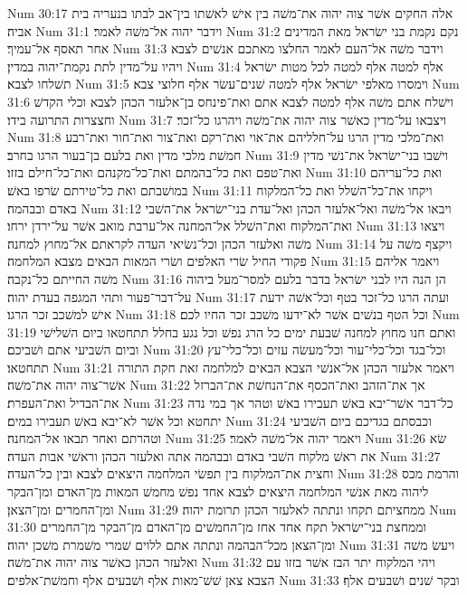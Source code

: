 Num 30:17  אלה החקים אשׁר צוה יהוה את־משׁה בין אישׁ לאשׁתו בין־אב לבתו בנעריה בית אביה׃
Num 31:1  וידבר יהוה אל־משׁה לאמר׃
Num 31:2  נקם נקמת בני ישׂראל מאת המדינים אחר תאסף אל־עמיך׃
Num 31:3  וידבר משׁה אל־העם לאמר החלצו מאתכם אנשׁים לצבא ויהיו על־מדין לתת נקמת־יהוה במדין׃
Num 31:4  אלף למטה אלף למטה לכל מטות ישׂראל תשׁלחו לצבא׃
Num 31:5  וימסרו מאלפי ישׂראל אלף למטה שׁנים־עשׂר אלף חלוצי צבא׃
Num 31:6  וישׁלח אתם משׁה אלף למטה לצבא אתם ואת־פינחס בן־אלעזר הכהן לצבא וכלי הקדשׁ וחצצרות התרועה בידו׃
Num 31:7  ויצבאו על־מדין כאשׁר צוה יהוה את־משׁה ויהרגו כל־זכר׃
Num 31:8  ואת־מלכי מדין הרגו על־חלליהם את־אוי ואת־רקם ואת־צור ואת־חור ואת־רבע חמשׁת מלכי מדין ואת בלעם בן־בעור הרגו בחרב׃
Num 31:9  וישׁבו בני־ישׂראל את־נשׁי מדין ואת־טפם ואת כל־בהמתם ואת־כל־מקנהם ואת־כל־חילם בזזו׃
Num 31:10  ואת כל־עריהם במושׁבתם ואת כל־טירתם שׂרפו באשׁ׃
Num 31:11  ויקחו את־כל־השׁלל ואת כל־המלקוח באדם ובבהמה׃
Num 31:12  ויבאו אל־משׁה ואל־אלעזר הכהן ואל־עדת בני־ישׂראל את־השׁבי ואת־המלקוח ואת־השׁלל אל־המחנה אל־ערבת מואב אשׁר על־ירדן ירחו׃
Num 31:13  ויצאו משׁה ואלעזר הכהן וכל־נשׂיאי העדה לקראתם אל־מחוץ למחנה׃
Num 31:14  ויקצף משׁה על פקודי החיל שׂרי האלפים ושׂרי המאות הבאים מצבא המלחמה׃
Num 31:15  ויאמר אליהם משׁה החייתם כל־נקבה׃
Num 31:16  הן הנה היו לבני ישׂראל בדבר בלעם למסר־מעל ביהוה על־דבר־פעור ותהי המגפה בעדת יהוה׃
Num 31:17  ועתה הרגו כל־זכר בטף וכל־אשׁה ידעת אישׁ למשׁכב זכר הרגו׃
Num 31:18  וכל הטף בנשׁים אשׁר לא־ידעו משׁכב זכר החיו לכם׃
Num 31:19  ואתם חנו מחוץ למחנה שׁבעת ימים כל הרג נפשׁ וכל נגע בחלל תתחטאו ביום השׁלישׁי וביום השׁביעי אתם ושׁביכם׃
Num 31:20  וכל־בגד וכל־כלי־עור וכל־מעשׂה עזים וכל־כלי־עץ תתחטאו׃
Num 31:21  ויאמר אלעזר הכהן אל־אנשׁי הצבא הבאים למלחמה זאת חקת התורה אשׁר־צוה יהוה את־משׁה׃
Num 31:22  אך את־הזהב ואת־הכסף את־הנחשׁת את־הברזל את־הבדיל ואת־העפרת׃
Num 31:23  כל־דבר אשׁר־יבא באשׁ תעבירו באשׁ וטהר אך במי נדה יתחטא וכל אשׁר לא־יבא באשׁ תעבירו במים׃
Num 31:24  וכבסתם בגדיכם ביום השׁביעי וטהרתם ואחר תבאו אל־המחנה׃
Num 31:25  ויאמר יהוה אל־משׁה לאמר׃
Num 31:26  שׂא את ראשׁ מלקוח השׁבי באדם ובבהמה אתה ואלעזר הכהן וראשׁי אבות העדה׃
Num 31:27  וחצית את־המלקוח בין תפשׂי המלחמה היצאים לצבא ובין כל־העדה׃
Num 31:28  והרמת מכס ליהוה מאת אנשׁי המלחמה היצאים לצבא אחד נפשׁ מחמשׁ המאות מן־האדם ומן־הבקר ומן־החמרים ומן־הצאן׃
Num 31:29  ממחציתם תקחו ונתתה לאלעזר הכהן תרומת יהוה׃
Num 31:30  וממחצת בני־ישׂראל תקח אחד אחז מן־החמשׁים מן־האדם מן־הבקר מן־החמרים ומן־הצאן מכל־הבהמה ונתתה אתם ללוים שׁמרי משׁמרת משׁכן יהוה׃
Num 31:31  ויעשׂ משׁה ואלעזר הכהן כאשׁר צוה יהוה את־משׁה׃
Num 31:32  ויהי המלקוח יתר הבז אשׁר בזזו עם הצבא צאן שׁשׁ־מאות אלף ושׁבעים אלף וחמשׁת־אלפים׃
Num 31:33  ובקר שׁנים ושׁבעים אלף׃

